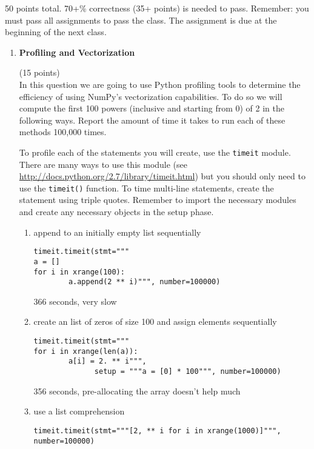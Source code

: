 \documentclass{article}
\newcounter{points}
\newcommand\setpoints[1]{\addtocounter{points}{#1}(#1 points)}
\begin{document}
\pagestyle{fancy}

50  points total.  70+\% correctness (35+ points) is needed to pass. Remember: you must pass all assignments to pass the class.  The assignment is due at the beginning of the next class.

\begin{enumerate}
\item \textbf{Profiling and Vectorization} \setpoints{15} \\
In this question we are going to use Python profiling tools to determine the efficiency of using NumPy's vectorization capabilities. To do so we will compute the first 100 powers (inclusive and starting from 0) of 2 in the following ways. Report the amount of time it takes to run each of these methods 100,000 times.
\vspace{.1in}

To profile each of the statements you will create, use the \texttt{timeit} module. There are many ways to use this module (see
\url{ http://docs.python.org/2.7/library/timeit.html}) but you should only need to use the \texttt{timeit()} function. To time multi-line statements, create the statement using triple quotes. Remember to import the necessary modules and create any necessary objects in the setup phase.

\begin{enumerate}
\item append  to an initially empty list sequentially 

\begin{verbatim}
timeit.timeit(stmt="""
a = []
for i in xrange(100):
        a.append(2 ** i)""", number=100000)       
\end{verbatim}
  366 seconds, very slow

\item create an list of zeros of size 100 and assign elements sequentially

\begin{verbatim}
timeit.timeit(stmt="""
for i in xrange(len(a)):
        a[i] = 2. ** i""", 
              setup = """a = [0] * 100""", number=100000)       
\end{verbatim}
356 seconds, pre-allocating the array doesn't help much


\item use a list comprehension

\begin{verbatim}
timeit.timeit(stmt="""[2, ** i for i in xrange(1000)]""", number=100000)
\end{verbatim}


\end{enumerate}
\end{enumerate}
\end{document}

